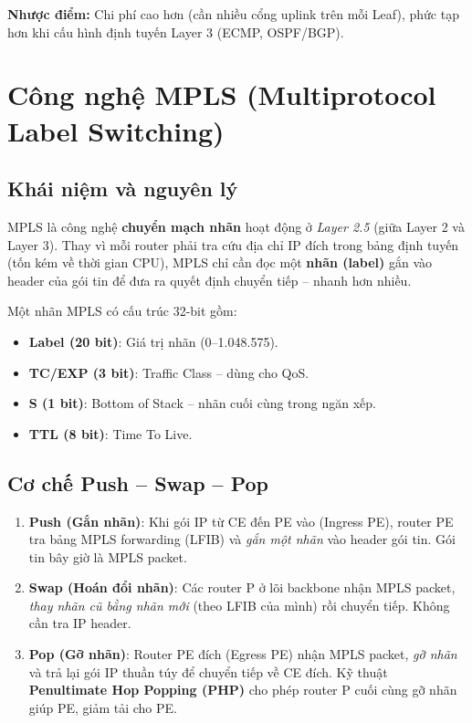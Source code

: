 \textbf{Nhược điểm:} Chi phí cao hơn (cần nhiều cổng uplink trên mỗi Leaf), phức tạp hơn khi cấu hình định tuyến Layer 3 (ECMP, OSPF/BGP).

\section{Công nghệ MPLS (Multiprotocol Label Switching)}

\subsection{Khái niệm và nguyên lý}

MPLS là công nghệ \textbf{chuyển mạch nhãn} hoạt động ở \textit{Layer 2.5} (giữa Layer 2 và Layer 3). Thay vì mỗi router phải tra cứu địa chỉ IP đích trong bảng định tuyến (tốn kém về thời gian CPU), MPLS chỉ cần đọc một \textbf{nhãn (label)} gắn vào header của gói tin để đưa ra quyết định chuyển tiếp – nhanh hơn nhiều.

Một nhãn MPLS có cấu trúc 32-bit gồm:
\begin{itemize}
    \item \textbf{Label (20 bit)}: Giá trị nhãn (0--1.048.575).
    \item \textbf{TC/EXP (3 bit)}: Traffic Class – dùng cho QoS.
    \item \textbf{S (1 bit)}: Bottom of Stack – nhãn cuối cùng trong ngăn xếp.
    \item \textbf{TTL (8 bit)}: Time To Live.
\end{itemize}

\subsection{Cơ chế Push -- Swap -- Pop}

\begin{enumerate}
    \item \textbf{Push (Gắn nhãn)}: Khi gói IP từ CE đến PE vào (Ingress PE), router PE tra bảng MPLS forwarding (LFIB) và \textit{gắn một nhãn} vào header gói tin. Gói tin bây giờ là MPLS packet.

    \item \textbf{Swap (Hoán đổi nhãn)}: Các router P ở lõi backbone nhận MPLS packet, \textit{thay nhãn cũ bằng nhãn mới} (theo LFIB của mình) rồi chuyển tiếp. Không cần tra IP header.

    \item \textbf{Pop (Gỡ nhãn)}: Router PE đích (Egress PE) nhận MPLS packet, \textit{gỡ nhãn} và trả lại gói IP thuần túy để chuyển tiếp về CE đích. Kỹ thuật \textbf{Penultimate Hop Popping (PHP)} cho phép router P cuối cùng gỡ nhãn giúp PE, giảm tải cho PE.
\end{enumerate}

